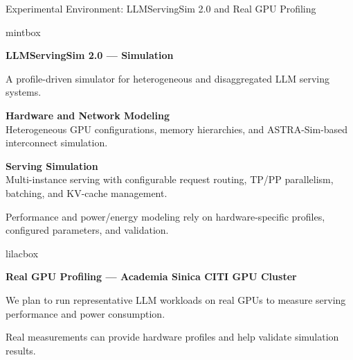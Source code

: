 \documentclass[aspectratio=169,10pt]{beamer}
\begin{document}
\begin{frame}[t,label=ENVIRONMENT]{Experimental Environment: LLMServingSim 2.0 and Real GPU Profiling}
\vspace{-.02cm}
\begin{beamercolorbox}[wd=\linewidth,rounded=true,sep=.12cm]{mintbox}
{\small\bfseries\color{Accent}LLMServingSim 2.0 --- Simulation\par}\vspace{.04cm}
{\small A profile-driven simulator for heterogeneous and disaggregated LLM serving systems.\par}\vspace{.12cm}
\setlength{\fboxsep}{5pt}%
\colorbox{Paper}{\begin{minipage}[t][1.3cm]{\dimexpr.485\linewidth-10pt\relax}\raggedright\footnotesize{\bfseries\color{Accent}Hardware and Network Modeling}\\[2pt]Heterogeneous GPU configurations, memory hierarchies, and ASTRA-Sim-based interconnect simulation.\end{minipage}}\hfill\colorbox{Paper}{\begin{minipage}[t][1.3cm]{\dimexpr.485\linewidth-10pt\relax}\raggedright\footnotesize{\bfseries\color{Accent}Serving Simulation}\\[2pt]Multi-instance serving with configurable request routing, TP/PP parallelism, batching, and KV-cache management.\end{minipage}}\par\vspace{.12cm}
{\footnotesize\color{Muted}Performance and power/energy modeling rely on hardware-specific profiles, configured parameters, and validation.\par}
\end{beamercolorbox}
\vspace{.12cm}
\begin{center}\end{center}
\vspace{-.12cm}
\begin{beamercolorbox}[wd=\linewidth,rounded=true,sep=.12cm]{lilacbox}
{\small\bfseries\color{Accent}Real GPU Profiling --- Academia Sinica CITI GPU Cluster\par}\vspace{.04cm}
{\small We plan to run representative LLM workloads on real GPUs to measure serving performance and power consumption.\par}\vspace{.06cm}
{\small Real measurements can provide hardware profiles and help validate simulation results.\par}
\end{beamercolorbox}
\end{frame}
\end{document}
